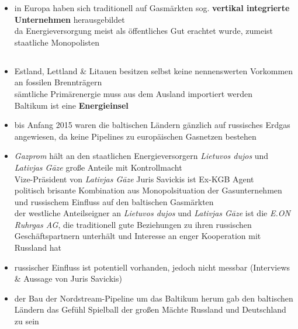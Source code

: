 \documentclass[11pt,a4paper]{article}
\begin{document}
\begin{itemize}
\item in Europa haben sich traditionell auf Gasmärkten sog. \textbf{vertikal integrierte Unternehmen} herausgebildet\\
 da Energieversorgung meist als öffentliches Gut erachtet wurde, zumeist staatliche Monopolisten


\end{itemize}




\subsection*{}

\begin{itemize}

\item Estland, Lettland \& Litauen besitzen selbst keine nennenswerten Vorkommen an fossilen Brennträgern\\
 sämtliche Primärenergie muss aus dem Ausland importiert werden\\
 Baltikum ist eine \textbf{Energieinsel}

\item bis Anfang 2015 waren die baltischen Ländern gänzlich auf russisches Erdgas angewiesen, da keine Pipelines zu europäischen Gasnetzen bestehen

\item \textsl{Gazprom} hält an den staatlichen Energieversorgern \emph{Lietuvos dujos} und \emph{Lativjas G\={a}ze} große Anteile mit Kontrollmacht\\
 Vize-Präsident von \emph{Lativjas G\={a}ze} Juris Savickis ist Ex-KGB Agent\\
 politisch brisante Kombination aus Monopolsituation der Gasunternehmen und russischem Einfluss auf den baltischen Gasmärkten\\
 der westliche Anteilseigner an \emph{Lietuvos dujos} und \emph{Lativjas G\={a}ze} ist die \textsl{E.ON Ruhrgas AG}, die traditionell gute Beziehungen zu ihren russischen Geschäftspartnern unterhält und Interesse an enger Kooperation mit Russland hat

\item russischer Einfluss ist potentiell vorhanden, jedoch nicht messbar (Interviews \& Aussage von Juris Savickis)

\item der Bau der Nordstream-Pipeline um das Baltikum herum gab den baltischen Ländern das Gefühl Spielball der großen Mächte Russland und Deutschland zu sein


\end{itemize}
\end{document}
